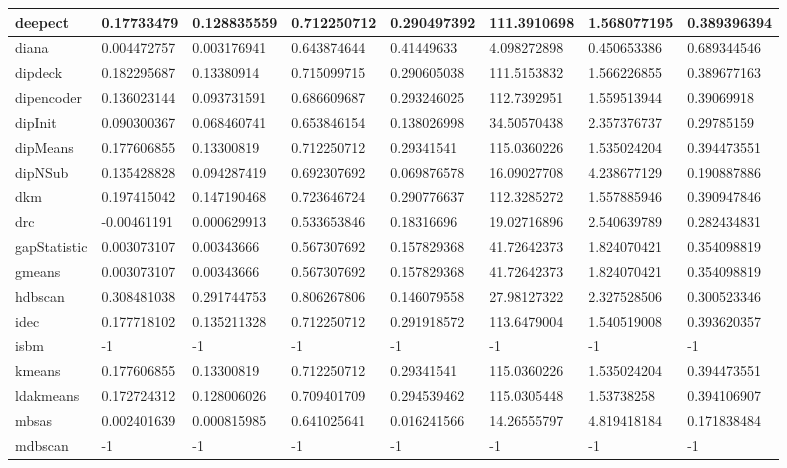\begin{table}[H]
\begin{tabular}{|l|l|l|l|l|l|l|l|}
\hline
deepect & 0.17733479 & 0.128835559 & 0.712250712 & 0.290497392 & 111.3910698 & 1.568077195 & 0.389396394 \\
\hline
diana & 0.004472757 & 0.003176941 & 0.643874644 & 0.41449633 & 4.098272898 & 0.450653386 & 0.689344546 \\
\hline
dipdeck & 0.182295687 & 0.13380914 & 0.715099715 & 0.290605038 & 111.5153832 & 1.566226855 & 0.389677163 \\
\hline
dipencoder & 0.136023144 & 0.093731591 & 0.686609687 & 0.293246025 & 112.7392951 & 1.559513944 & 0.39069918 \\
\hline
dipInit & 0.090300367 & 0.068460741 & 0.653846154 & 0.138026998 & 34.50570438 & 2.357376737 & 0.29785159 \\
\hline
dipMeans & 0.177606855 & 0.13300819 & 0.712250712 & 0.29341541 & 115.0360226 & 1.535024204 & 0.394473551 \\
\hline
dipNSub & 0.135428828 & 0.094287419 & 0.692307692 & 0.069876578 & 16.09027708 & 4.238677129 & 0.190887886 \\
\hline
dkm & 0.197415042 & 0.147190468 & 0.723646724 & 0.290776637 & 112.3285272 & 1.557885946 & 0.390947846 \\
\hline
drc & -0.00461191 & 0.000629913 & 0.533653846 & 0.18316696 & 19.02716896 & 2.540639789 & 0.282434831 \\
\hline
gapStatistic & 0.003073107 & 0.00343666 & 0.567307692 & 0.157829368 & 41.72642373 & 1.824070421 & 0.354098819 \\
\hline
gmeans & 0.003073107 & 0.00343666 & 0.567307692 & 0.157829368 & 41.72642373 & 1.824070421 & 0.354098819 \\
\hline
hdbscan & 0.308481038 & 0.291744753 & 0.806267806 & 0.146079558 & 27.98127322 & 2.327528506 & 0.300523346 \\
\hline
idec & 0.177718102 & 0.135211328 & 0.712250712 & 0.291918572 & 113.6479004 & 1.540519008 & 0.393620357 \\
\hline
isbm & -1 & -1 & -1 & -1 & -1 & -1 & -1 \\
\hline
kmeans & 0.177606855 & 0.13300819 & 0.712250712 & 0.29341541 & 115.0360226 & 1.535024204 & 0.394473551 \\
\hline
ldakmeans & 0.172724312 & 0.128006026 & 0.709401709 & 0.294539462 & 115.0305448 & 1.53738258 & 0.394106907 \\
\hline
mbsas & 0.002401639 & 0.000815985 & 0.641025641 & 0.016241566 & 14.26555797 & 4.819418184 & 0.171838484 \\
\hline
mdbscan & -1 & -1 & -1 & -1 & -1 & -1 & -1 \\

\end{tabular}
\end{table}
